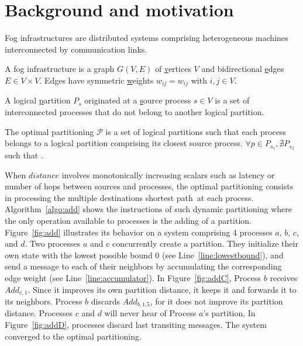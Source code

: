 
\section{Background and motivation}
\label{sec:background}

Fog infrastructures are distributed systems comprising heterogeneous
machines interconnected by communication links.

\begin{definition}
  A fog infrastructure is a \underline{g}raph $G(V, E)$ of
  \underline{v}ertices $V$ and bidirectional \underline{e}dges $E \in
  V \times V$. Edges have symmetric \underline{w}eights $w_{ij} =
  w_{ij}$ with $i, j \in V$.
\end{definition}

\begin{definition}
  A logical \underline{p}artition $P_s$ originated at a
  \underline{s}ource process $s \in V$ is a set of interconnected
  processes that do not belong to another logical partition.
\end{definition}

\begin{definition}
  The optimal partitioning $\mathcal{P}$ is a set of logical
  partitions such that each process belongs to a logical partition
  comprising its closest source process. $\forall p \in P_{s_1},
  \nexists P_{s_2}$ such that .
\end{definition}

When $distance$ involves monotonically increasing scalars such as
latency or number of hops between sources and processes, the optimal
partitioning consists in processing the multiple destinations shortest
path~\REF at each process.  Algorithm~\ref{algo:add} shows the
instructions of such dynamic partitioning where the only operation
available to processes is the adding of a
partition. Figure~\ref{fig:add} illustrates its behavior on a system
comprising 4 processes $a$, $b$, $c$, and $d$. Two processes $a$ and
$c$ concurrently create a partition. They initialize their own state
with the lowest possible bound $0$ (see Line~\ref{line:lowestbound}),
and send a message to each of their neighbors by accumulating the
corresponding edge weight (see Line~\ref{line:accumulator}). In
Figure~\ref{fig:addC}, Process $b$ receives $Add_{c, 1}$. Since it
improves its own partition distance, it keeps it and forwards it to
its neighbors. Process $b$ discards $Add_{b, 1.5}$, for it does not
improve its partition distance. Processes $c$ and $d$ will never hear
of Process $a$'s partition. In Figure~\ref{fig:addD}, processes
discard last transiting messages. The system converged to the optimal
partitioning. 


